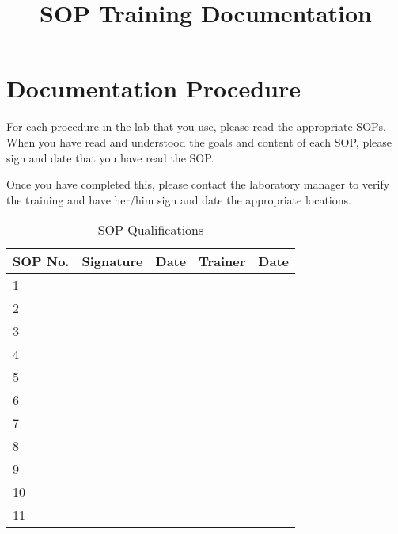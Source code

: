 \documentclass{article}
\title{SOP Training Documentation}
\begin{document}


\maketitle

\section{Documentation Procedure}

For each procedure in the lab that you use, please read the appropriate SOPs. When you have read and understood the goals and content of each SOP, please sign and date that you have read the SOP. 

Once you have completed this, please contact the laboratory manager to verify the training and have her/him sign and date the appropriate locations.

\begin{table}[h]
	\caption{SOP Qualifications}
	\label{tab:CommonObjects}
		\begin{tabular}{|l|p{3cm}|p{2cm}|p{3cm}|p{2cm}|}\hline
SOP No. & Signature & Date  & Trainer & Date \\
\hline\hline
1  & & & & \\ \hline
2  & & & & \\ \hline
3  & & & & \\ \hline
4  & & & & \\ \hline
5  & & & & \\ \hline
6  & & & & \\ \hline
7  & & & & \\ \hline
8  & & & & \\ \hline
9  & & & & \\ \hline
10  & & & & \\ \hline
11  & & & & \\ \hline
		\end{tabular}

\end{table}
\end{document}
